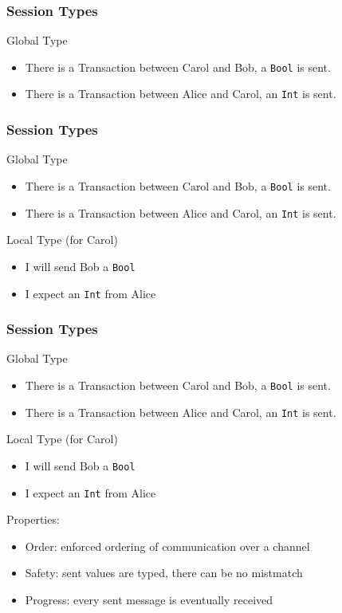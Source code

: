 \documentclass[12pt]{beamer}
\begin{document}
\begin{frame}[t]
\frametitle{Session Types}

Global Type

\begin{itemize}
    \item There is a Transaction between Carol and Bob, a \texttt{Bool} is sent.
    \item There is a Transaction between Alice and Carol, an \texttt{Int} is sent.
\end{itemize}

\end{frame}

\begin{frame}[t]
\frametitle{Session Types}

Global Type

\begin{itemize}
    \item There is a Transaction between Carol and Bob, a \texttt{Bool} is sent.
    \item There is a Transaction between Alice and Carol, an \texttt{Int} is sent.
\end{itemize}

Local Type (for Carol)

\begin{itemize}
    \item I will send Bob a \texttt{Bool}
    \item I expect an \texttt{Int} from Alice
\end{itemize}

\end{frame}

\begin{frame}[t]
\frametitle{Session Types}

Global Type

\begin{itemize}
    \item There is a Transaction between Carol and Bob, a \texttt{Bool} is sent.
    \item There is a Transaction between Alice and Carol, an \texttt{Int} is sent.
\end{itemize}

Local Type (for Carol)

\begin{itemize}
    \item I will send Bob a \texttt{Bool}
    \item I expect an \texttt{Int} from Alice
\end{itemize}

Properties: 
\begin{itemize}
    \item Order: enforced ordering of communication over a channel
    \item Safety: sent values are typed, there can be no mistmatch
    \item Progress: every sent message is eventually received
\end{itemize}
\end{frame}
\end{document}
